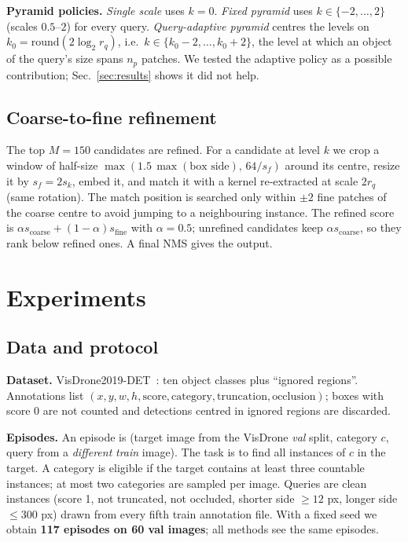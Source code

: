 \documentclass[10pt,twocolumn,letterpaper]{article}
\begin{document}
\noindent\textbf{Pyramid policies.} \emph{Single scale} uses $k=0$. \emph{Fixed pyramid} uses $k\in\{-2,\dots,2\}$ (scales $0.5$--$2$) for every query. \emph{Query-adaptive pyramid} centres the levels on $k_0=\mathrm{round}(2\log_2 r_q)$, i.e.\ $k\in\{k_0-2,\dots,k_0+2\}$, the level at which an object of the query's size spans $n_p$ patches. We tested the adaptive policy as a possible contribution; Sec.~\ref{sec:results} shows it did not help.

\subsection{Coarse-to-fine refinement}
The top $M=150$ candidates are refined. For a candidate at level $k$ we crop a window of half-size $\max(1.5\,\max(\text{box side}),\,64/s_f)$ around its centre, resize it by $s_f=2s_k$, embed it, and match it with a kernel re-extracted at scale $2r_q$ (same rotation). The match position is searched only within $\pm2$ fine patches of the coarse centre to avoid jumping to a neighbouring instance. The refined score is $\alpha s_{\text{coarse}}+(1-\alpha)s_{\text{fine}}$ with $\alpha=0.5$; unrefined candidates keep $\alpha s_{\text{coarse}}$, so they rank below refined ones. A final NMS gives the output.

\section{Experiments}
\label{sec:experiments}

\subsection{Data and protocol}
\noindent\textbf{Dataset.} VisDrone2019-DET~\cite{zhu2021visdrone}: ten object classes plus ``ignored regions''. Annotations list $(x,y,w,h,\text{score},\text{category},\text{truncation},\text{occlusion})$; boxes with score 0 are not counted and detections centred in ignored regions are discarded.

\noindent\textbf{Episodes.} An episode is (target image from the VisDrone \emph{val} split, category $c$, query from a \emph{different} \emph{train} image). The task is to find all instances of $c$ in the target. A category is eligible if the target contains at least three countable instances; at most two categories are sampled per image. Queries are clean instances (score 1, not truncated, not occluded, shorter side $\ge12$ px, longer side $\le300$ px) drawn from every fifth train annotation file. With a fixed seed we obtain \textbf{117 episodes on 60 val images}; all methods see the same episodes.
\end{document}
